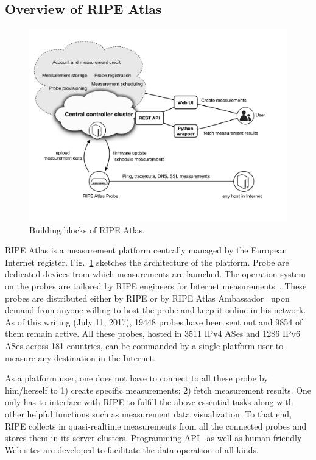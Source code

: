 \subsection{Overview of RIPE Atlas}
\begin{figure}[!htb]
\centering
\includegraphics[width=\textwidth]{gfx/chap3/ripe_atlas_archi.pdf}
\caption{Building blocks of RIPE Atlas.}
\label{fig:ripe_atlas_archi}
\end{figure}

\acf{RIPE} Atlas is a measurement platform centrally managed by the European Internet register.
Fig.~\ref{fig:ripe_atlas_archi} sketches the architecture of the platform.
Probe are dedicated devices from which measurements are launched.
The operation system on the probes are tailored by RIPE engineers for Internet measurements~\cite{firmware}.
These probes are distributed either by RIPE or by RIPE Atlas Ambassador~\cite{ambassador} upon demand from anyone willing to host the probe and keep it online in his network.
As of this writing (July 11, 2017), 19448 probes have been sent out and 9854 of them remain active.
All these probes, hosted in 3511 IPv4 ASes and 1286 IPv6 ASes across 181 countries, can be commanded by a single platform user to measure any destination in the Internet.

As a platform user, one does not have to connect to all these probe by him/herself to 1) create specific measurements; 2) fetch measurement results. 
One only has to interface with RIPE to fulfill the above essential tasks along with other helpful functions such as measurement data visualization.
To that end, RIPE collects in quasi-realtime measurements from all the connected probes and stores them in its server clusters. Programming API~\cite{atlasapi} as well as human friendly Web sites are developed to facilitate the data operation of all kinds.

